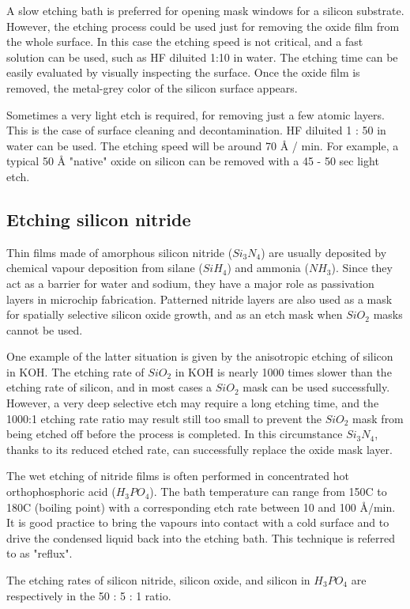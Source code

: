 A slow etching bath is preferred for opening mask windows for a silicon substrate.
However, the etching process could be used just for removing the oxide film from the whole surface.
In this case the etching speed is not critical, and a fast solution can be used, such as HF diluited 1:10 in water.
The etching time can be easily evaluated by visually inspecting the surface.
Once the oxide film is removed, the metal-grey color of the silicon surface appears.

Sometimes a very light etch is required, for removing just a few atomic layers.
This is the case of surface cleaning and decontamination. HF diluited 1 : 50 in water can be used.
The etching speed will be around 70 \r{A} / min. For example, a typical 50 \r{A} "native" oxide on silicon can be removed with a 45 - 50 sec light etch.

\newpage

\subsection{Etching silicon nitride}
Thin films made of amorphous silicon nitride ($Si_3N_4$) are usually deposited by chemical vapour deposition from silane ($SiH_4$) and ammonia ($NH_3$).
Since they act as a barrier for water and sodium, they have a major role as passivation layers in microchip fabrication.
Patterned nitride layers are also used as a mask for spatially selective silicon oxide growth, and as an etch mask when $SiO_2$ masks cannot be used.

One example of the latter situation is given by the anisotropic etching of silicon in KOH.
The etching rate of $SiO_2$ in KOH is nearly 1000 times slower than the etching rate of silicon, and in most cases a $SiO_2$ mask can be used successfully.
However, a very deep selective etch may require a long etching time, and the 1000:1 etching rate ratio may result still too small to prevent the $SiO_2$ mask from being etched off before the process is completed.
In this circumstance $Si_3N_4$, thanks to its reduced etched rate, can successfully replace the oxide mask layer.

The wet etching of nitride films is often performed in concentrated hot orthophosphoric acid ($H_3PO_4$).
The bath temperature can range from 150\degree C to 180\degree C (boiling point) with a corresponding etch rate between 10 and 100 \r{A}/min. 
It is good practice to bring the vapours into contact with a cold surface and to drive the condensed liquid back into the etching bath.
This technique is referred to as "reflux".\label{chemistry_reflux}

The etching rates of silicon nitride, silicon oxide, and silicon in $H_3PO_4$ are respectively in the 50 : 5 : 1 ratio.
